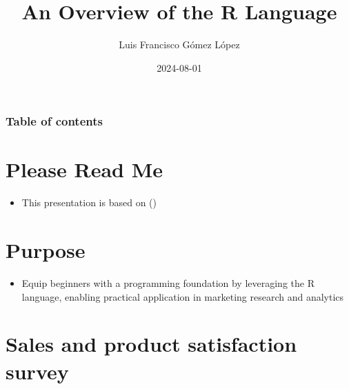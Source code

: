 \documentclass[
  ignorenonframetext,
]{beamer}
\title{An Overview of the R Language}
\author{Luis Francisco Gómez López}
\date{2024-08-01}
\institute{FAEDIS}
\providecommand{\tightlist}{%
  \setlength{\itemsep}{0pt}\setlength{\parskip}{0pt}}\usepackage{longtable,booktabs,array}
\renewcommand*\contentsname{Table of contents}
\newcommand\contentsname{Table of contents}
\begin{document}
\frame{\titlepage}

\renewcommand*\contentsname{Table of contents}
\begin{frame}[allowframebreaks]
  \frametitle{Table of contents}
  \tableofcontents[hideallsubsections]
\end{frame}

\section{Please Read Me}\label{please-read-me}

\begin{frame}{}
\label{section}
\begin{itemize}
\tightlist
\item
  This presentation is based on ()
\end{itemize}
\end{frame}

\section{Purpose}\label{purpose}

\begin{frame}{}
\label{section-1}
\begin{itemize}
\tightlist
\item
  Equip beginners with a programming foundation by leveraging the R
  language, enabling practical application in marketing research and
  analytics
\end{itemize}
\end{frame}

\section{Sales and product satisfaction
survey}\label{sales-and-product-satisfaction-survey}
\end{document}
